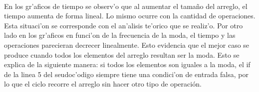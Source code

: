 \paragraph{}
En los gr'aficos de tiempo se observ'o que al aumentar el tama\~{n}o del arreglo, el tiempo 
aumenta de forma lineal. Lo mismo ocurre con la cantidad de operaciones. Esta situaci'on se 
corresponde con el an'alisis te'orico que se realiz'o. Por otro lado en los gr'aficos en funci'on 
de la frecuencia de la moda, el tiempo y las operaciones parecieran decrecer linealmente. Esto 
evidencia que el mejor caso se produce cuando todos los elementos del arreglo resultan ser la moda. Esto se
explica de la siguiente manera: si todos los elementos son iguales a la moda, el if de la linea 5 del seudoc'odigo
siempre tiene una condici'on de entrada falsa, por lo que el ciclo recorre el arreglo sin hacer otro tipo de operación.
